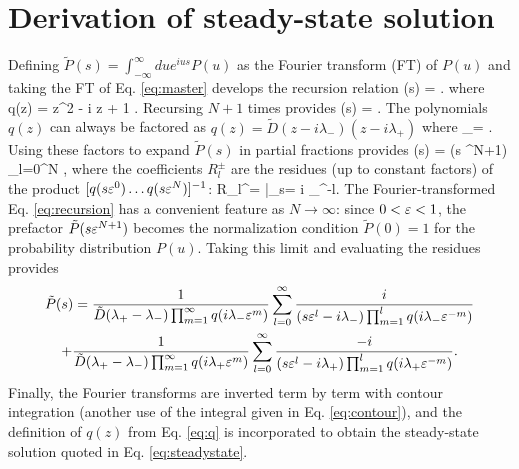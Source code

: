 \section{Derivation of steady-state solution}
\label{sec:langsteadyderiv}
Defining $\tilde{P}(s) = \int_{-\infty}^\infty du e^{i u s} P(u) $ as the Fourier transform (FT) of $P(u)$ and taking the FT of Eq. \ref{eq:master} develops the recursion relation
\be {}(s) = . \ee
where
\be q(z) =  z^2 - i \tilde{\Gamma} z + 1 . \label{eq:q} \ee
Recursing $N+1$ times provides
\be {}(s) = .\label{eq:recursion}\ee
The polynomials $q(z)$ can always be factored as $q(z) = \tilde{D}(z - i\lambda_-)(z - i\lambda_+)$ where
\be \lambda_\pm = . \label{eq:lambdas}\ee
Using these factors to expand $\tilde{P}(s)$ in partial fractions provides
\be {}(s)  = (s \ve^{N+1}) \sum_{l=0}^N   ,\ee
where the coefficients $R_l^\pm$ are the residues (up to constant factors) of the product $[q(s\varepsilon^0)\dots q(s\varepsilon^N)]^{-1}$:
\be R_l^\pm =  \Big|_{s= i \lambda_\pm \ve^{-l}}.\ee
The Fourier-transformed Eq. \ref{eq:recursion} has a convenient feature as $N\rightarrow \infty$: since $0<\varepsilon <1$, the prefactor $\tilde{P}( s \varepsilon^{N+1})$ becomes the normalization condition $\tilde{P}(0)=1$ for the probability distribution $P(u)$.
Taking this limit and evaluating the residues provides 
\begin{multline} \tilde{P}(s) = \frac{1}{\tilde{D}(\lambda_+ - \lambda_-) \prod_{m=1}^\infty q(i \lambda_- \varepsilon^m)} \sum_{l=0}^\infty \frac{i}{(s\varepsilon^l-i\lambda_-)\prod_{m=1}^l q(i\lambda_- \varepsilon^{-m})} 
	\\+ \frac{1}{\tilde{D}(\lambda_+ - \lambda_-) \prod_{m=1}^\infty q(i \lambda_+ \varepsilon^m)} \sum_{l=0}^\infty \frac{-i}{(s\varepsilon^l-i \lambda_+)\prod_{m=1}^l q(i\lambda_+ \varepsilon^{-m})}. \end{multline}
Finally, the Fourier transforms are inverted term by term with contour integration (another use of the integral given in Eq. \ref{eq:contour}), and the definition of $q(z)$ from Eq. \ref{eq:q} is incorporated to obtain the steady-state solution quoted in Eq. \ref{eq:steadystate}.

